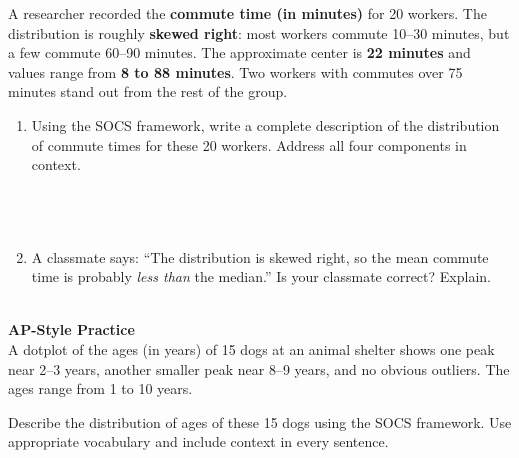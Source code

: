 \documentclass[10pt]{article}
\begin{document}
\namedateperiod

\vspace{0.22in}

\begin{tcolorbox}[colback=sky, colframe=navy, boxrule=0.9pt, arc=2mm,
    left=4mm, right=4mm, top=3mm, bottom=3mm]
\small A researcher recorded the \textbf{commute time (in minutes)} for
20 workers. The distribution is roughly \textbf{skewed right}: most
workers commute 10--30 minutes, but a few commute 60--90 minutes.
The approximate center is \textbf{22 minutes} and values range from
\textbf{8 to 88 minutes}. Two workers with commutes over 75 minutes
stand out from the rest of the group.
\end{tcolorbox}

\vspace{0.22in}

\begin{enumerate}[leftmargin=1.5em, itemsep=14pt]

  \item Using the SOCS framework, write a complete description of the
        distribution of commute times for these 20 workers. Address all
        four components in context.\\[6pt]
        \writeline\\[1pt]\writeline\\[1pt]\writeline\\[1pt]\writeline

  \item A classmate says: ``The distribution is skewed right, so the mean
        commute time is probably \textit{less than} the median.'' Is your
        classmate correct? Explain.\\[6pt]
        \writeline\\[1pt]\writeline

\end{enumerate}

\vspace{0.18in}

\begin{tcolorbox}[colback=redbg, colframe=redacc, boxrule=0.8pt, arc=2mm,
    left=4mm, right=4mm, top=3mm, bottom=3mm]
\small\textbf{AP-Style Practice}\\[6pt]
A dotplot of the ages (in years) of 15 dogs at an animal shelter shows one
peak near 2--3 years, another smaller peak near 8--9 years, and no obvious
outliers. The ages range from 1 to 10 years.

\vspace{8pt}
Describe the distribution of ages of these 15 dogs using the SOCS framework.
Use appropriate vocabulary and include context in every sentence.\\[8pt]
\writeline\\[1pt]\writeline\\[1pt]\writeline
\end{tcolorbox}
\end{document}
